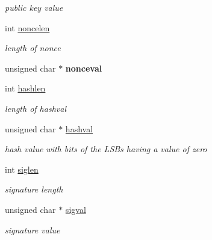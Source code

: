 \begin{DoxyCompactItemize}
\begin{DoxyCompactList}\small\item\em public key value \end{DoxyCompactList}\item 
\mbox{\label{structcs2014coin__t__defn_a5d529f678ef0f035ca32dff4665da144}} 
int \hyperlink{structcs2014coin__t__defn_a5d529f678ef0f035ca32dff4665da144}{noncelen}
\begin{DoxyCompactList}\small\item\em length of nonce \end{DoxyCompactList}\item 
\mbox{\label{structcs2014coin__t__defn_add7ffdae6b0118288b17915fdbf683f0}} 
unsigned char $\ast$ {\bfseries nonceval}
\item 
\mbox{\label{structcs2014coin__t__defn_a211e649505f46b21df016560bc3436db}} 
int \hyperlink{structcs2014coin__t__defn_a211e649505f46b21df016560bc3436db}{hashlen}
\begin{DoxyCompactList}\small\item\em length of hashval \end{DoxyCompactList}\item 
\mbox{\label{structcs2014coin__t__defn_a09793a60685db1da70a2286fc8b830d0}} 
unsigned char $\ast$ \hyperlink{structcs2014coin__t__defn_a09793a60685db1da70a2286fc8b830d0}{hashval}
\begin{DoxyCompactList}\small\item\em hash value with \textquotesingle{}bits\textquotesingle{} of the L\+S\+Bs having a value of zero \end{DoxyCompactList}\item 
\mbox{\label{structcs2014coin__t__defn_a05de8a4c54de475945bc4611b8cd743b}} 
int \hyperlink{structcs2014coin__t__defn_a05de8a4c54de475945bc4611b8cd743b}{siglen}
\begin{DoxyCompactList}\small\item\em signature length \end{DoxyCompactList}\item 
\mbox{\label{structcs2014coin__t__defn_a7f4784554e4643461c6d78775703318f}} 
unsigned char $\ast$ \hyperlink{structcs2014coin__t__defn_a7f4784554e4643461c6d78775703318f}{sigval}
\begin{DoxyCompactList}\small\item\em signature value \end{DoxyCompactList}\end{DoxyCompactItemize}


